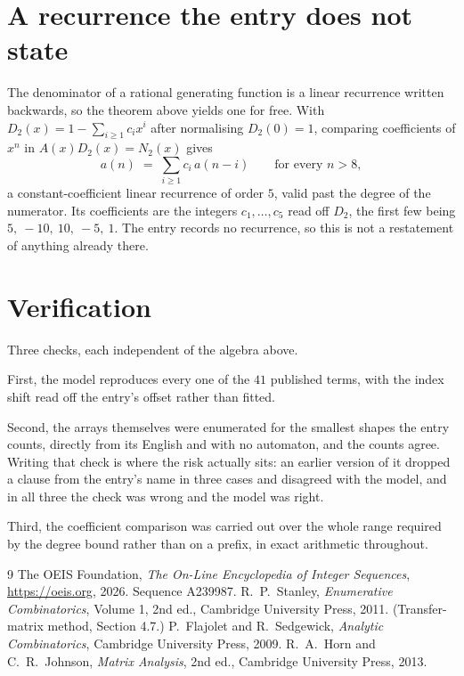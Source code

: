 \documentclass[11pt,a4paper]{article}
\theoremstyle{plain}
\theoremstyle{definition}
\begin{document}
\section{A recurrence the entry does not state}

The denominator of a rational generating function is a linear recurrence written backwards, so
the theorem above yields one for free. With $D_2(x)=1-\sum_{i\ge1}c_ix^i$ after normalising
$D_2(0)=1$, comparing coefficients of $x^n$ in $A(x)D_2(x)=N_2(x)$ gives
\[
a(n)\;=\;\sum_{i\ge1}c_i\,a(n-i)\qquad\text{for every }n>8,
\]
a constant-coefficient linear recurrence of order $5$, valid past the degree of the
numerator. Its coefficients are the integers $c_1,\dots,c_{5}$ read off $D_2$, the first few being $5,\ -10,\ 10,\ -5,\ 1$. The entry records no recurrence, so this is not a restatement of anything
already there.

\section{Verification}

Three checks, each independent of the algebra above.

First, the model reproduces every one of the $41$ published terms, with the index shift
read off the entry's offset rather than fitted.

Second, the arrays themselves were enumerated for the smallest shapes the entry counts,
directly from its English and with no automaton, and the counts agree. Writing that check is
where the risk actually sits: an earlier version of it dropped a clause from the entry's name
in three cases and disagreed with the model, and in all three the check was wrong and the model
was right.

Third, the coefficient comparison was carried out over the whole range required by the degree
bound rather than on a prefix, in exact arithmetic throughout.

\begin{thebibliography}{9}
 The OEIS Foundation, \emph{The On-Line Encyclopedia of Integer
Sequences}, \url{https://oeis.org}, 2026. Sequence A239987.
 R.~P.~Stanley, \emph{Enumerative Combinatorics}, Volume 1, 2nd ed.,
Cambridge University Press, 2011. (Transfer-matrix method, Section 4.7.)
 P.~Flajolet and R.~Sedgewick, \emph{Analytic Combinatorics}, Cambridge
University Press, 2009.
 R.~A.~Horn and C.~R.~Johnson, \emph{Matrix Analysis}, 2nd ed., Cambridge
University Press, 2013.
\end{thebibliography}
\end{document}
